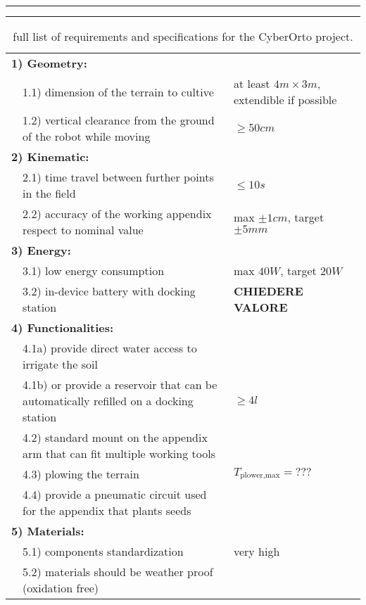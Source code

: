 \begin{table}[pbt]
	\rule{\linewidth}{2pt}
	\caption{full list of requirements and specifications for the CyberOrto project.}
	\label{tab:requirementsspecifications}
	\rule{\linewidth}{1pt} \vspace{0mm}	
	
	\centering
	\begin{tabular}{p{0.2cm} p{8cm} p{5cm} }
		\multicolumn{2}{l}{ \textbf{1) Geometry:} } \\
		& 1.1) dimension of the terrain to cultive & at least $4m\times 3m$, extendible if possible \\
		& 1.2) vertical clearance from the ground of the robot while moving & $\geq 50cm$ \\
		
		\multicolumn{2}{l}{ \textbf{2) Kinematic:} } \\
		& 2.1) time travel between further points in the field & $ \leq 10s$ \\	
		& 2.2) accuracy of the working appendix respect to nominal value & max $\pm 1cm$, target $\pm 5mm$ \\		
		
		\multicolumn{2}{l}{ \textbf{3) Energy:} } \\
		& 3.1) low energy consumption & max $40W$, target $20W$ \\
		& 3.2) in-device battery with docking station & \textbf{CHIEDERE VALORE}\\
				
		\multicolumn{2}{l}{ \textbf{4) Functionalities:} } \\
		& 4.1a) provide direct water access to irrigate the soil \\
		& 4.1b) or provide a reservoir that can be automatically refilled on a docking station & $\geq 4l$ \\
		& 4.2) standard mount on the appendix arm that can fit multiple working tools \\
		& 4.3) plowing the terrain & $T_\textrm{plower,max} = ??? $\\
		& 4.4) provide a pneumatic circuit used for the appendix that plants seeds \\
		
		\multicolumn{2}{l}{ \textbf{5) Materials:} } \\
		& 5.1) components standardization & very high \\
		& 5.2) materials should be weather proof (oxidation free) \\
		

\end{tabular}
\end{table}
